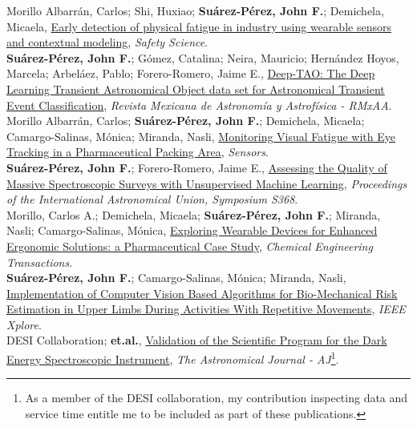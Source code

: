 \documentclass[10pt, a4paper]{article}
\newcommand{\years}[1]{\marginnote{\scriptsize #1}}
\begin{document}
\years{2026}Morillo Albarrán, Carlos; Shi, Huxiao; \textbf{Suárez-Pérez, John F.}; Demichela, Micaela, \href{https://www.sciencedirect.com/science/article/pii/S0925753525002668}{Early detection of physical fatigue in industry using wearable sensors and contextual modeling}, \emph{Safety Science}.
\\

\years{2025}\textbf{Suárez-Pérez, John F.}; Gómez, Catalina; Neira, Mauricio; Hernández Hoyos, Marcela; Arbeláez, Pablo; Forero-Romero, Jaime E., \href{https://www.astroscu.unam.mx/rmaa/RMxAA..61-2/PDF/RMxAA..61-2_jsuarez-III.pdf}{Deep-TAO: The Deep Learning Transient Astronomical Object data set for Astronomical Transient Event Classification}, \emph{Revista Mexicana de Astronomía y Astrofísica - RMxAA}.
\\

\years{2025}Morillo Albarrán, Carlos; \textbf{Suárez-Pérez, John F.}; Demichela, Micaela; Camargo-Salinas, Mónica; Miranda, Nasli, \href{https://www.mdpi.com/1424-8220/25/18/5702}{Monitoring Visual Fatigue with Eye Tracking in a Pharmaceutical Packing Area}, \emph{Sensors}.
\\

\years{2025}\textbf{Suárez-Pérez, John F.}; Forero-Romero, Jaime E., \href{https://www.cambridge.org/core/journals/proceedings-of-the-international-astronomical-union/article/abs/assessing-the-quality-of-massive-spectroscopic-surveys-with-unsupervised-machine-learning/E40E4ED6D22975318BD8D11ED8E3BA32}{Assessing the Quality of Massive Spectroscopic Surveys with Unsupervised Machine Learning}, \emph{Proceedings of the International Astronomical Union, Symposium S368}.
\\

\years{2025}Morillo, Carlos A.; Demichela, Micaela; \textbf{Suárez-Pérez, John F.}; Miranda, Nasli; Camargo-Salinas, Mónica, \href{https://www.cetjournal.it/cet/25/116/005.pdf}{Exploring Wearable Devices for Enhanced Ergonomic Solutions: a Pharmaceutical Case Study}, \emph{Chemical Engineering Transactions}.
\\

\years{2024}\textbf{Suárez-Pérez, John F.}; Camargo-Salinas, Mónica; Miranda, Nasli, \href{Suárez-Pérez, John F.; Camargo-Salinas, Mónica; Miranda, Nasli}{Implementation of Computer Vision Based Algorithms for Bio-Mechanical Risk Estimation in Upper Limbs During Activities With Repetitive Movements}, \emph{IEEE Xplore}.
\\

\years{2024}DESI Collaboration; \textbf{et.al.}, \href{https://iopscience.iop.org/article/10.3847/1538-3881/ad0b08/pdf}{Validation of the 
	Scientific Program for the Dark Energy Spectroscopic Instrument}, \emph{The Astronomical Journal - AJ}\footnote[1]{As a member of the DESI collaboration, my contribution inspecting data and service time entitle me to be included as part of these publications.}.
\\
\end{document}
